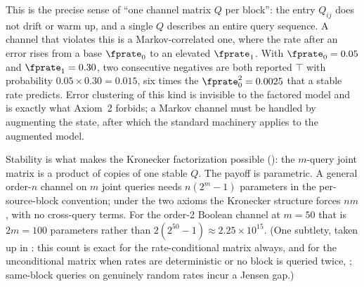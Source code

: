 This is the precise sense of ``one channel matrix $Q$ per block'': the entry
$Q_{ij}$ does not drift or warm up, and a single $Q$ describes an entire query
sequence. A channel that violates this is a Markov-correlated one, where the
rate after an error rises from a base $\fprate_0$ to an elevated $\fprate_1$.
With $\fprate_0 = 0.05$ and $\fprate_1 = 0.30$, two consecutive negatives are
both reported $\top$ with probability $0.05 \times 0.30 = 0.015$, six times the
$\fprate_0^2 = 0.0025$ that a stable rate predicts. Error clustering of this
kind is invisible to the factored model and is exactly what Axiom~2 forbids; a
Markov channel must be handled by augmenting the state, after which the standard
machinery applies to the augmented model.

Stability is what makes the Kronecker factorization possible
(): the $m$-query joint matrix is a product of copies of one
stable $Q$. The payoff is parametric. A general order-$n$ channel on $m$ joint
queries needs $n(2^m - 1)$ parameters in the per-source-block convention; under
the two axioms the Kronecker structure forces $nm$, with no cross-query terms.
For the order-2 Boolean channel at $m = 50$ that is $2m = 100$ parameters rather
than $2(2^{50} - 1) \approx 2.25 \times 10^{15}$. (One subtlety, taken up in
: this count is exact for the rate-conditional matrix
always, and for the unconditional matrix when rates are deterministic or no
block is queried twice, ; same-block queries
on genuinely random rates incur a Jensen gap.)
